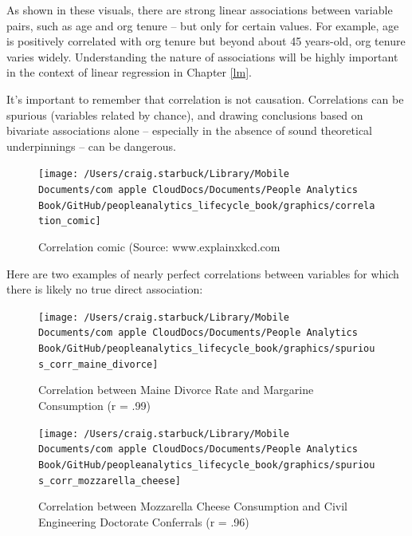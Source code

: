 \documentclass[]{book}
\begin{document}
As shown in these visuals, there are strong linear associations between variable pairs, such as age and org tenure -- but only for certain values. For example, age is positively correlated with org tenure but beyond about 45 years-old, org tenure varies widely. Understanding the nature of associations will be highly important in the context of linear regression in Chapter \ref{lm}.

It's important to remember that correlation is not causation. Correlations can be spurious (variables related by chance), and drawing conclusions based on bivariate associations alone -- especially in the absence of sound theoretical underpinnings -- can be dangerous.

\begin{figure}

{\centering \texttt{[image: /Users/craig.starbuck/Library/Mobile Documents/com~apple~CloudDocs/Documents/People Analytics Book/GitHub/peopleanalytics\_lifecycle\_book/graphics/correlation\_comic]} 

}

\caption{Correlation comic (Source: www.explainxkcd.com}\label{fig:corr-comic}
\end{figure}

Here are two examples of nearly perfect correlations between variables for which there is likely no true direct association:

\begin{figure}

{\centering \texttt{[image: /Users/craig.starbuck/Library/Mobile Documents/com~apple~CloudDocs/Documents/People Analytics Book/GitHub/peopleanalytics\_lifecycle\_book/graphics/spurious\_corr\_maine\_divorce]} 

}

\caption{Correlation between Maine Divorce Rate and Margarine Consumption (r = .99)}\label{fig:spur-corr-1}
\end{figure}

\begin{figure}

{\centering \texttt{[image: /Users/craig.starbuck/Library/Mobile Documents/com~apple~CloudDocs/Documents/People Analytics Book/GitHub/peopleanalytics\_lifecycle\_book/graphics/spurious\_corr\_mozzarella\_cheese]} 

}

\caption{Correlation between Mozzarella Cheese Consumption and Civil Engineering Doctorate Conferrals (r = .96)}\label{fig:spur-corr-2}
\end{figure}
\end{document}
